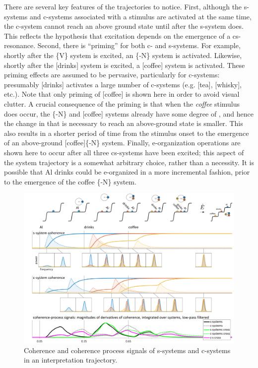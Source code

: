   There are several key features of the trajectories to notice. First, although the s-systems and c-systems associated with a stimulus are activated at the same time, the c-system cannot reach an above ground state until after the s-system does. This reflects the hypothesis that excitation depends on the emergence of a cs-resonance. Second, there is “priming” for both c- and s-systems. For example, shortly after the \{V\} system is excited, an \{-N\} system is activated. Likewise, shortly after the [drinks] system is excited, a [coffee] system is activated. These priming effects are assumed to be pervasive, particularly for c-systems: presumably [drinks] activates a large number of c-systems (e.g. [tea], [whisky], etc.). Note that only priming of [coffee] is shown here in order to avoid visual clutter. A crucial consequence of the priming is that when the \textit{coffee} stimulus does occur, the \{-N\} and [coffee] systems already have some degree of , and hence the change in  that is necessary to reach an above-ground state is smaller. This also results in a shorter period of time from the stimulus onset to the emergence of an above-ground [coffee]\{-N\} system. Finally, e-organization operations are shown here to occur after all three cs-systems have been excited; this aspect of the system trajectory is a somewhat arbitrary choice, rather than a necessity. It is possible that {\textbar}Al drinks{\textbar} could be e-organized in a more incremental fashion, prior to the emergence of the {\textbar}coffee \{-N\}{\textbar} system. 

  
\begin{figure}
\includegraphics[width=\textwidth]{figures/Tilsen-img141.png}
\caption{Coherence and coherence process signals of s-systems and c-systems in an interpretation trajectory.}
\label{fig:6:22}
\end{figure}
 


